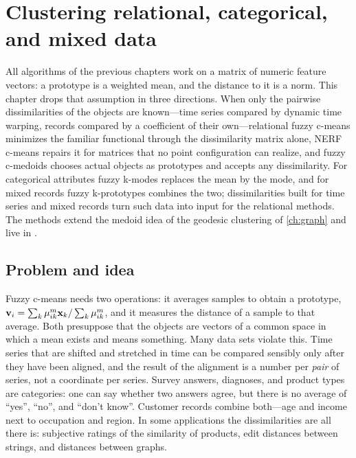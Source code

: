 \chapter[Relational and mixed data]{Clustering relational, categorical, and mixed data}\label{ch:relational}
\begin{roadmap}
All algorithms of the previous chapters work on a matrix of numeric feature vectors: a prototype is a weighted mean, and the distance to it is a norm. This chapter drops that assumption in three directions. When only the pairwise dissimilarities of the objects are known---time series compared by dynamic time warping, records compared by a coefficient of their own---relational fuzzy c-means minimizes the familiar functional through the dissimilarity matrix alone, NERF c-means repairs it for matrices that no point configuration can realize, and fuzzy c-medoids chooses actual objects as prototypes and accepts any dissimilarity. For categorical attributes fuzzy k-modes replaces the mean by the mode, and for mixed records fuzzy k-prototypes combines the two; dissimilarities built for time series and mixed records turn such data into input for the relational methods. The methods extend the medoid idea of the geodesic clustering of \cref{ch:graph} and live in .
\end{roadmap}

\section{Problem and idea}\label{sec:rel:problem}

Fuzzy c-means needs two operations: it averages samples to obtain a prototype, $\mathbf{v}_i=\sum_k\mu_{ik}^m\mathbf{x}_k/\sum_k\mu_{ik}^m$, and it measures the distance of a sample to that average. Both presuppose that the objects are vectors of a common space in which a mean exists and means something. Many data sets violate this. Time series that are shifted and stretched in time can be compared sensibly only after they have been aligned, and the result of the alignment is a number per \emph{pair} of series, not a coordinate per series. Survey answers, diagnoses, and product types are categories: one can say whether two answers agree, but there is no average of ``yes'', ``no'', and ``don't know''. Customer records combine both---age and income next to occupation and region. In some applications the dissimilarities are all there is: subjective ratings of the similarity of products, edit distances between strings, and distances between graphs.

